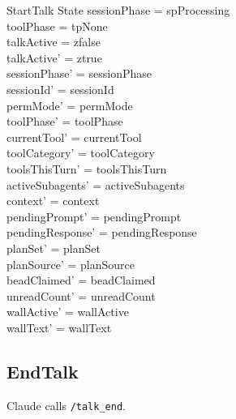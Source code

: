 \documentclass[a4paper,10pt,fleqn]{article}
\begin{document}
\begin{schema}{StartTalk}
  \Delta State
  \where
  sessionPhase = spProcessing \\
  toolPhase = tpNone \\
  talkActive = zfalse \\
  talkActive' = ztrue \\
  sessionPhase' = sessionPhase \\
  sessionId' = sessionId \\
  permMode' = permMode \\
  toolPhase' = toolPhase \\
  currentTool' = currentTool \\
  toolCategory' = toolCategory \\
  toolsThisTurn' = toolsThisTurn \\
  activeSubagents' = activeSubagents \\
  context' = context \\
  pendingPrompt' = pendingPrompt \\
  pendingResponse' = pendingResponse \\
  planSet' = planSet \\
  planSource' = planSource \\
  beadClaimed' = beadClaimed \\
  unreadCount' = unreadCount \\
  wallActive' = wallActive \\
  wallText' = wallText
\end{schema}

\subsection{EndTalk}

Claude calls \texttt{/talk\_end}.
\end{document}
